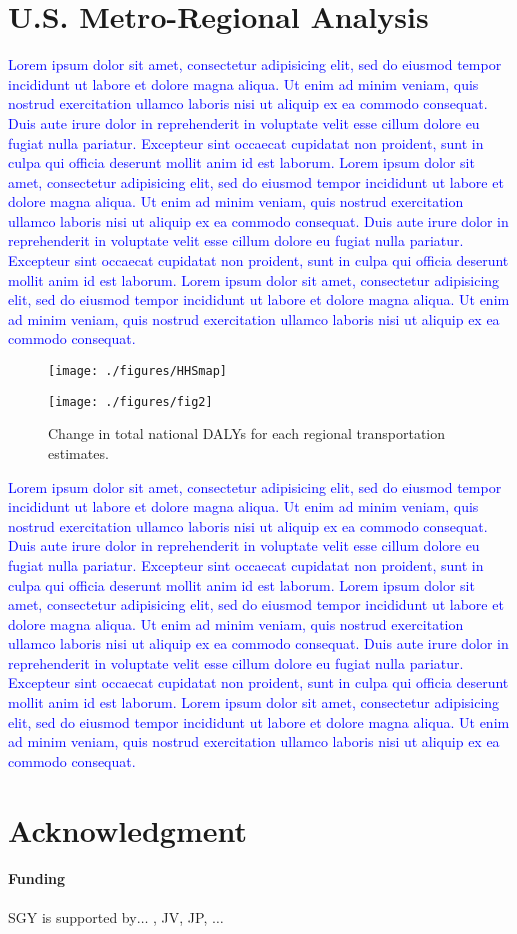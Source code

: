 \documentclass{bioinfo}
\newcommand{\col}[2][red]{\textcolor{#1}{#2}}
\begin{document}
\section{U.S. Metro-Regional Analysis}
\col[blue]{Lorem ipsum dolor sit amet, consectetur adipisicing elit, sed do
eiusmod tempor incididunt ut labore et dolore magna aliqua. Ut enim ad
minim veniam, quis nostrud exercitation ullamco laboris nisi ut
aliquip ex ea commodo consequat. Duis aute irure dolor in
reprehenderit in voluptate velit esse cillum dolore eu fugiat nulla
pariatur. Excepteur sint occaecat cupidatat non proident, sunt in
culpa qui officia deserunt mollit anim id est laborum. Lorem ipsum
dolor sit amet, consectetur adipisicing elit, sed do eiusmod tempor
incididunt ut labore et dolore magna aliqua. Ut enim ad minim veniam,
quis nostrud exercitation ullamco laboris nisi ut aliquip ex ea
commodo consequat. Duis aute irure dolor in reprehenderit in voluptate
velit esse cillum dolore eu fugiat nulla pariatur. Excepteur sint
occaecat cupidatat non proident, sunt in culpa qui officia deserunt
mollit anim id est laborum. Lorem ipsum dolor sit amet, consectetur
adipisicing elit, sed do eiusmod tempor incididunt ut labore et dolore
magna aliqua. Ut enim ad minim veniam, quis nostrud exercitation
ullamco laboris nisi ut aliquip ex ea commodo consequat.}


\begin{figure}[t]
    \centerline{\texttt{[image: ./figures/HHSmap]}}
    \centerline{\texttt{[image: ./figures/fig2]}}
    \caption{Change in total national DALYs for each regional
      transportation estimates.}\label{dalyFigure}
\end{figure}

\col[blue]{Lorem ipsum dolor sit amet, consectetur adipisicing elit, sed do
eiusmod tempor incididunt ut labore et dolore magna aliqua. Ut enim ad
minim veniam, quis nostrud exercitation ullamco laboris nisi ut
aliquip ex ea commodo consequat. Duis aute irure dolor in
reprehenderit in voluptate velit esse cillum dolore eu fugiat nulla
pariatur. Excepteur sint occaecat cupidatat non proident, sunt in
culpa qui officia deserunt mollit anim id est laborum. Lorem ipsum
dolor sit amet, consectetur adipisicing elit, sed do eiusmod tempor
incididunt ut labore et dolore magna aliqua. Ut enim ad minim veniam,
quis nostrud exercitation ullamco laboris nisi ut aliquip ex ea
commodo consequat. Duis aute irure dolor in reprehenderit in voluptate
velit esse cillum dolore eu fugiat nulla pariatur. Excepteur sint
occaecat cupidatat non proident, sunt in culpa qui officia deserunt
mollit anim id est laborum. Lorem ipsum dolor sit amet, consectetur
adipisicing elit, sed do eiusmod tempor incididunt ut labore et dolore
magna aliqua. Ut enim ad minim veniam, quis nostrud exercitation
ullamco laboris nisi ut aliquip ex ea commodo consequat.}

\section*{Acknowledgment}
\paragraph{Funding\textcolon} SGY is supported by$\ldots$ , JV, JP, $\ldots$

%
%


\end{document}
